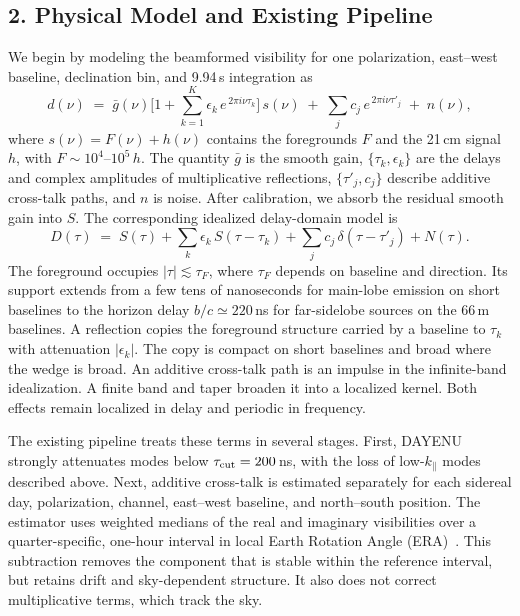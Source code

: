 \documentclass[12pt]{article}
\newcommand{\kpar}{k_\parallel}
\begin{document}
\subsection*{2. Physical Model and Existing Pipeline}

We begin by modeling the beamformed visibility for one polarization, east--west baseline, declination bin, and 9.94\,s integration as
\begin{equation}
d(\nu) \;=\; \bar g(\nu)\Big[1 + \sum_{k=1}^{K} \epsilon_k\, e^{\,2\pi i \nu \tau_k}\Big]\, s(\nu) \;+\; \sum_{j} c_j\, e^{\,2\pi i \nu \tau'_j} \;+\; n(\nu),
\label{eq:model}
\end{equation}
where $s(\nu)=F(\nu)+h(\nu)$ contains the foregrounds $F$ and the 21\,cm signal $h$, with $F\sim10^4$--$10^5\,h$. The quantity $\bar g$ is the smooth gain, $\{\tau_k,\epsilon_k\}$ are the delays and complex amplitudes of multiplicative reflections, $\{\tau'_j,c_j\}$ describe additive cross-talk paths, and $n$ is noise. After calibration, we absorb the residual smooth gain into $S$. The corresponding idealized delay-domain model is
\begin{equation}
D(\tau) \;=\; S(\tau) + \sum_k \epsilon_k\, S(\tau - \tau_k) + \sum_j c_j\, \delta(\tau-\tau'_j) + N(\tau).
\label{eq:delay}
\end{equation}
The foreground occupies $|\tau|\lesssim\tau_F$, where $\tau_F$ depends on baseline and direction. Its support extends from a few tens of nanoseconds for main-lobe emission on short baselines to the horizon delay $b/c\simeq220$\,ns for far-sidelobe sources on the 66\,m baselines. A reflection copies the foreground structure carried by a baseline to $\tau_k$ with attenuation $|\epsilon_k|$. The copy is compact on short baselines and broad where the wedge is broad. An additive cross-talk path is an impulse in the infinite-band idealization. A finite band and taper broaden it into a localized kernel. Both effects remain localized in delay and periodic in frequency.

The existing pipeline treats these terms in several stages. First, DAYENU strongly attenuates modes below $\tau_{\rm cut}=200$\,ns, with the loss of low-$\kpar$ modes described above. Next, additive cross-talk is estimated separately for each sidereal day, polarization, channel, east--west baseline, and north--south position. The estimator uses weighted medians of the real and imaginary visibilities over a quarter-specific, one-hour interval in local Earth Rotation Angle (ERA)~\cite[Sec.~3.5.2; Eq.~(27)]{chime2025auto}. This subtraction removes the component that is stable within the reference interval, but retains drift and sky-dependent structure. It also does not correct multiplicative terms, which track the sky.
\end{document}
